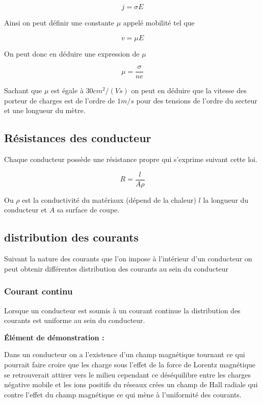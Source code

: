 \documentclass[12pt,a4paper]{article}
\begin{document}
\begin{equation}
j = \sigma E
\end{equation}

Ainsi on peut définir une constante $\mu$ appelé mobilité tel que 

\begin{equation*}
v = \mu E
\end{equation*}

On peut donc en déduire une expression de $\mu$

\begin{equation}
\mu = \frac{\sigma}{n e}
\end{equation}

Sachant que $\mu$ est égale à $30 cm^2 / (Vs)$ on peut en déduire que la vitesse des porteur de charges est de l'ordre de $1 m/s$ pour des tensions de l'ordre du secteur et une longueur du mètre.


\subsection{Résistances des conducteur}

Chaque conducteur possède une résistance propre qui s'exprime suivant cette loi.

\begin{equation}
R = \frac{ l}{A \rho}
\end{equation}

Ou $\rho$ est la conductivité du matériaux (dépend de la chaleur) $l$ la longueur du conducteur et $A$ sa surface de coupe.

\subsection{distribution des courants}

Suivant la nature des courants que l'on impose à l'intérieur d'un conducteur on peut obtenir différentes distribution des courants au sein du conducteur

\subsubsection{Courant continu}

Lorsque un conducteur est soumis à un courant continue la distribution des courants est uniforme au sein du conducteur.

\textbf{Élément de démonstration :}

Dans un conducteur on a l'existence d'un champ magnétique tournant ce qui pourrait faire croire que les charge sous l'effet de la force de Lorentz magnétique se retrouverait attirer vers le milieu cependant ce déséquilibre entre les charges négative mobile et les ions positifs du réseaux crées un champ de Hall radiale qui contre l'effet du champ magnétique ce qui mène à l'uniformité des courants.
\end{document}
